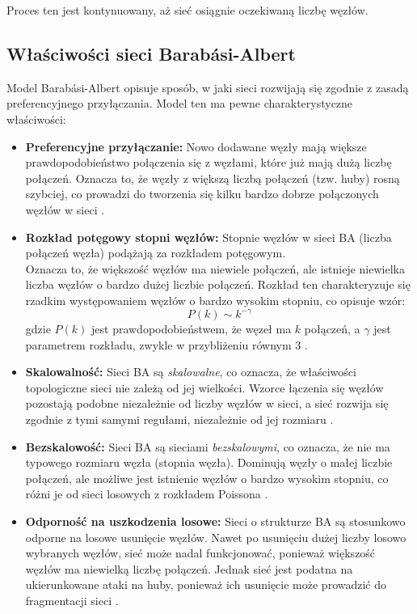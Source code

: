 Proces ten jest kontynuowany, aż sieć osiągnie oczekiwaną liczbę węzłów.

\subsection{Właściwości sieci Barabási-Albert}
Model Barabási-Albert opisuje sposób, w jaki sieci rozwijają się zgodnie z zasadą preferencyjnego przyłączania. Model ten ma pewne charakterystyczne właściwości:

\begin{itemize}
      \item \textbf{Preferencyjne przyłączanie:} Nowo dodawane węzły mają większe prawdopodobieństwo połączenia się z węzłami, które już mają dużą liczbę połączeń.
            Oznacza to, że węzły z większą liczbą połączeń (tzw. huby) rosną szybciej, co prowadzi do tworzenia się kilku bardzo dobrze połączonych węzłów w sieci \cite{Barabasi1999}.

      \item \textbf{Rozkład potęgowy stopni węzłów:} Stopnie węzłów w sieci BA (liczba połączeń węzła) podążają za rozkładem potęgowym.
            \\ Oznacza to, że większość węzłów ma niewiele połączeń, ale istnieje niewielka liczba węzłów o bardzo dużej liczbie połączeń.
            Rozkład ten charakteryzuje się rzadkim występowaniem węzłów o bardzo wysokim stopniu, co opisuje wzór:
            \begin{equation}
                  P(k) \sim k^{-\gamma}
                  \label{eq:power-law-probability}
            \end{equation}
            gdzie $P(k)$ jest prawdopodobieństwem, że węzeł ma $k$ połączeń, a $\gamma$ jest parametrem rozkładu, zwykle w przybliżeniu równym 3 \cite{Barabasi1999}.

      \item \textbf{Skalowalność:} Sieci BA są \textit{skalowalne}, co oznacza, że właściwości topologiczne sieci nie zależą od jej wielkości.
            Wzorce łączenia się węzłów pozostają podobne niezależnie od liczby węzłów w sieci, a sieć rozwija się zgodnie z tymi samymi regułami, niezależnie od jej rozmiaru \cite{Newman2003}.

      \item \textbf{Bezskalowość:} Sieci BA są sieciami \textit{bezskalowymi}, co oznacza, że nie ma typowego rozmiaru węzła (stopnia węzła).
            Dominują węzły o małej liczbie połączeń, ale możliwe jest istnienie węzłów o bardzo wysokim stopniu, co różni je od sieci losowych z rozkładem Poissona \cite{Albert2002}.

      \item \textbf{Odporność na uszkodzenia losowe:} Sieci o strukturze BA są stosunkowo odporne na losowe usunięcie węzłów.
            Nawet po usunięciu dużej liczby losowo wybranych węzłów, sieć może nadal funkcjonować, ponieważ większość węzłów ma niewielką liczbę połączeń.
            Jednak sieć jest podatna na ukierunkowane ataki na huby, ponieważ ich usunięcie może prowadzić do fragmentacji sieci \cite{Albert2000}.
\end{itemize}


